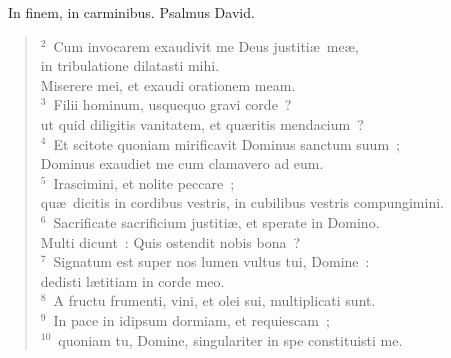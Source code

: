 ~\lettrine[lines=10,image=true,loversize=0.05,lraise=-0.03]{I}{}n finem, in carminibus. Psalmus David.
\begin{flushleft}\begin{verse}\vspace{6pt}${}^{2}$~Cum invocarem exaudivit me Deus justiti\ae\ me\ae ,\\ in tribulatione dilatasti mihi.\\ Miserere mei, et exaudi orationem meam.\\
${}^{3}$~Filii hominum, usquequo gravi corde~?\\ ut quid diligitis vanitatem, et qu\ae ritis mendacium~?\\
${}^{4}$~Et scitote quoniam mirificavit Dominus sanctum suum~;\\ Dominus exaudiet me cum clamavero ad eum.\\
${}^{5}$~Irascimini, et nolite peccare~;\\ qu\ae\ dicitis in cordibus vestris, in cubilibus vestris compungimini.\\
${}^{6}$~Sacrificate sacrificium justiti\ae , et sperate in Domino.\\ Multi dicunt~: Quis ostendit nobis bona~?\\
${}^{7}$~Signatum est super nos lumen vultus tui, Domine~:\\ dedisti l\ae titiam in corde meo.\\
${}^{8}$~A fructu frumenti, vini, et olei sui, multiplicati sunt.\\
${}^{9}$~In pace in idipsum dormiam, et requiescam~;\\
${}^{10}$~quoniam tu, Domine, singulariter in spe constituisti me.\end{verse}\end{flushleft}


